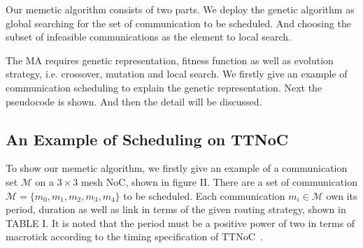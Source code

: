 \documentclass[journal]{IEEEtran}
\begin{document}
Our memetic algorithm consists of two parts. We deploy the genetic algorithm as global searching for the set of communication to be scheduled. And choosing the subset of infeasible communications as the element to local search.

The MA requires genetic representation, fitness function as well as evolution strategy, i.e. crossover, mutation and local search. We firstly give an example of communication scheduling to explain the genetic representation. Next the pseudocode is shown. And then the detail will be discussed.

\subsection{An Example of Scheduling on TTNoC}

To show our memetic algorithm, we firstly give an example of a communication set $\mathcal{M}$ on a $3\times 3$ mesh NoC, shown in figure II. There are a set of communication $\mathcal{M} = \{m_{0},m_{1},m_{2},m_{3},m_{4}\}$ to be scheduled. Each communication $m_{i}\in\mathcal{M}$ own its period, duration as well as link in terms of the given routing strategy, shown in TABLE I. 
It is noted that the period must be a positive power of two in terms of macrotick according to the timing specification of TTNoC~\cite{DBLP:conf/date/HuangBRBK12}.
 
\end{document}
